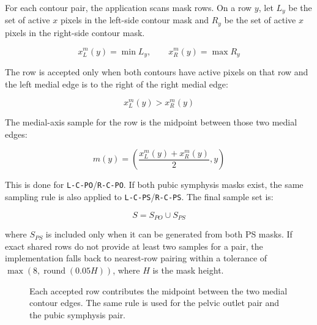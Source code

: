 \documentclass[11pt]{article}
\begin{document}
For each contour pair, the application scans mask rows. On a row \(y\), let
\(L_y\) be the set of active \(x\) pixels in the left-side contour mask and
\(R_y\) be the set of active \(x\) pixels in the right-side contour mask.

\[
    x_L^{m}(y) = \min L_y,
    \qquad
    x_R^{m}(y) = \max R_y
\]

The row is accepted only when both contours have active pixels on that row and
the left medial edge is to the right of the right medial edge:

\[
    x_L^{m}(y) > x_R^{m}(y)
\]

The medial-axis sample for the row is the midpoint between those two medial
edges:

\[
    m(y) =
    \left(
        \frac{x_L^{m}(y) + x_R^{m}(y)}{2},
        y
    \right)
\]

This is done for \texttt{L-C-PO}/\texttt{R-C-PO}. If both pubic symphysis masks
exist, the same sampling rule is also applied to \texttt{L-C-PS}/\texttt{R-C-PS}.
The final sample set is:

\[
    S = S_{PO} \cup S_{PS}
\]

where \(S_{PS}\) is included only when it can be generated from both PS masks.
If exact shared rows do not provide at least two samples for a pair, the
implementation falls back to nearest-row pairing within a tolerance of
\(\max(8,\operatorname{round}(0.05H))\), where \(H\) is the mask height.

\begin{figure}[htbp]
\centering
{}
\caption{Each accepted row contributes the midpoint between the two medial
contour edges. The same rule is used for the pelvic outlet pair and the pubic
symphysis pair.}
\end{figure}
\end{document}
